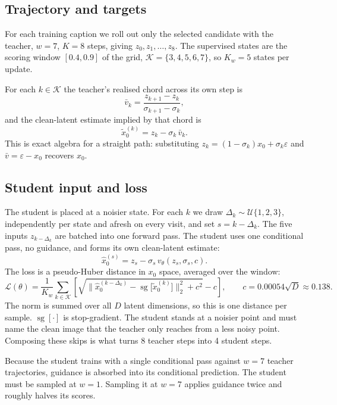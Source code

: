 \documentclass[11pt,a4paper]{article}
\DeclareMathOperator{\sg}{sg}
\begin{document}
\subsection{Trajectory and targets}
For each training caption we roll out only the selected candidate with the teacher, $w=7$, $K=8$ steps, giving $z_0,z_1,\dots,z_8$. The supervised states are the scoring window $[0.4,0.9]$ of the grid, $\mathcal{K}=\{3,4,5,6,7\}$, so $K_w=5$ states per update.

For each $k\in\mathcal{K}$ the teacher's realised chord across its own step is
\begin{equation}
\bar{v}_k=\frac{z_{k+1}-z_k}{\sigma_{k+1}-\sigma_k},
\end{equation}
and the clean-latent estimate implied by that chord is
\begin{equation}
\tilde{x}_0^{(k)}=z_k-\sigma_k\,\bar{v}_k.
\end{equation}
This is exact algebra for a straight path: substituting $z_k=(1-\sigma_k)x_0+\sigma_k\varepsilon$ and $\bar{v}=\varepsilon-x_0$ recovers $x_0$.

\subsection{Student input and loss}
The student is placed at a noisier state. For each $k$ we draw $\Delta_k\sim\mathcal{U}\{1,2,3\}$, independently per state and afresh on every visit, and set $s=k-\Delta_k$. The five inputs $z_{k-\Delta_k}$ are batched into one forward pass. The student uses one conditional pass, no guidance, and forms its own clean-latent estimate:
\begin{equation}
\hat{x}_0^{(s)}=z_s-\sigma_s\,v_\theta(z_s,\sigma_s,c).
\end{equation}
The loss is a pseudo-Huber distance in $x_0$ space, averaged over the window:
\begin{equation}
\mathcal{L}(\theta)=\frac{1}{K_w}\sum_{k\in\mathcal{K}}\left[\sqrt{\big\lVert\hat{x}_0^{(k-\Delta_k)}-\sg\big[\tilde{x}_0^{(k)}\big]\big\rVert_2^2+c^2}-c\right],\qquad c=0.00054\sqrt{D}\approx0.138.
\end{equation}
The norm is summed over all $D$ latent dimensions, so this is one distance per sample. $\sg[\cdot]$ is stop-gradient. The student stands at a noisier point and must name the clean image that the teacher only reaches from a less noisy point. Composing these skips is what turns 8 teacher steps into 4 student steps.

Because the student trains with a single conditional pass against $w=7$ teacher trajectories, guidance is absorbed into its conditional prediction. The student must be sampled at $w=1$. Sampling it at $w=7$ applies guidance twice and roughly halves its scores.
\end{document}
